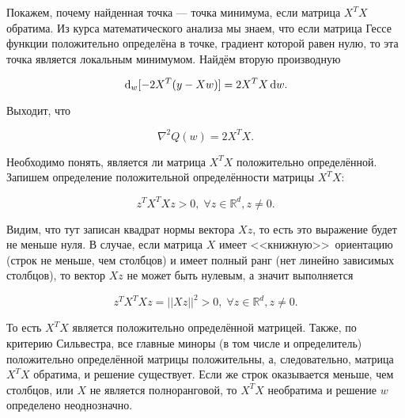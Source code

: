 \documentclass[12pt,fleqn]{article}
\newcommand{\dx}[1]{\,\mathrm{d}#1} %
\begin{document}
Покажем, почему найденная точка — точка минимума, если матрица $X^T X$ обратима. Из курса математического анализа мы знаем, что если матрица Гессе функции положительно определёна в точке, градиент которой равен нулю, то эта точка является локальным минимумом. Найдём вторую производную 

\[
\dx_w[-2X^T(y-Xw)] = 2X^TX \dx w.
\]

Выходит, что 

\[
\nabla^2 Q(w) = 2X^TX.
\]

Необходимо понять, является ли матрица $X^TX$ положительно определённой. Запишем определение положительной определённости матрицы  $X^TX$:

\[
z^TX^TXz > 0, \; \forall z \in \mathbb{R}^d, z \ne 0.
\]

Видим, что тут записан квадрат нормы вектора $Xz$, то есть это выражение будет не меньше нуля. В случае, если матрица $X$ имеет <<книжную>>\ ориентацию (строк не меньше, чем столбцов) и имеет полный ранг (нет линейно зависимых столбцов), то вектор $Xz$ не может быть нулевым, а значит выполняется

\[
z^TX^TXz = ||Xz||^2 > 0, \; \forall z \in \mathbb{R}^d, z \ne 0.
\]

То есть $X^TX$ является положительно определённой матрицей. Также, по критерию Сильвестра, все главные миноры (в том числе и определитель) положительно определённой матрицы положительны, а, следовательно, матрица $X^TX$ обратима, и решение существует. Если же строк оказывается меньше, чем столбцов, или $X$ не является полноранговой, то $X^TX$ необратима и решение $w$ определено неоднозначно. 
\end{document}
